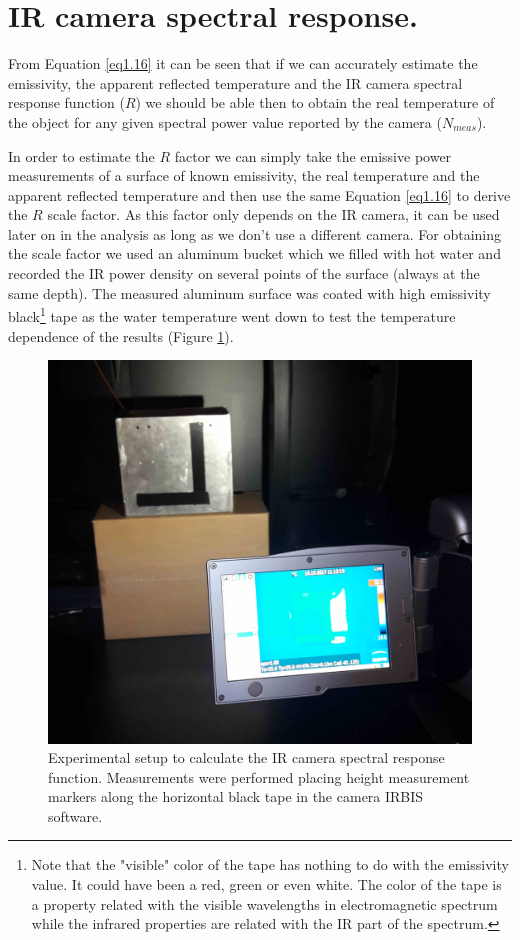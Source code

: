 	\section{IR camera spectral response.}\label{section3.2}
	
		From Equation \ref{eq1.16} it can be seen that if we can accurately estimate the emissivity, the apparent reflected temperature and the IR camera spectral response function ($R$) we should be able then to obtain the real temperature of the object for any given spectral power value reported by the camera ($N_{meas}$). 
		
		In order to estimate the $R$ factor we can simply take the emissive power measurements of a surface of known emissivity, the real temperature and the apparent reflected temperature and then use the same Equation \ref{eq1.16} to derive the $R$ scale factor. As this factor only depends on the IR camera, it can be used later on in the analysis as long as we don’t use a different camera.
		For obtaining the scale factor we used an aluminum bucket which we filled with hot water and recorded the IR power density on several points of the surface (always at the same depth). The measured aluminum surface was coated with high emissivity black\footnote{{\footnotesize Note that the "visible" color of the tape has nothing to do with the emissivity value. It could have been a red, green or even white. The color of the tape is a property related with the visible wavelengths in electromagnetic spectrum while the infrared properties are related with the IR part of the spectrum.}} tape as the water temperature went down to test the temperature dependence of the results (Figure \ref{fig3.1}).
		
		\begin{figure}[ht!]
			\centering
			\captionsetup{justification=centering,margin=2cm}
			\includegraphics[scale=0.10]{Figures/Chapter03/CameraAndBucket.jpg}
			\caption{Experimental setup to calculate the IR camera spectral response function. Measurements were performed placing height measurement markers along the horizontal black tape in the camera IRBIS software.}\label{fig3.1}
		\end{figure}
		
